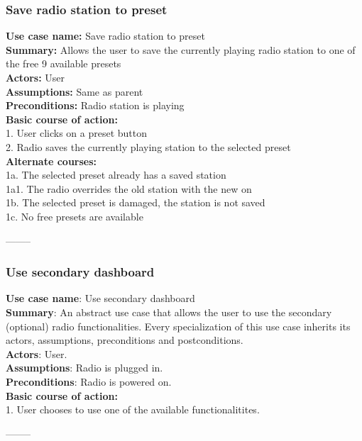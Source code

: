 \documentclass[11pt]{article}
\begin{document}
\subsubsection{Save radio station to preset}
\textbf{Use case name:} Save radio station to preset\\
\textbf{Summary:} Allows the user to save the currently playing radio station to one of the free 9 available presets\\
\textbf{Actors:} User\\
\textbf{Assumptions:} Same as parent\\
\textbf{Preconditions:} Radio station is playing\\
\textbf{Basic course of action:}\\
1. User clicks on a preset button\\
2. Radio saves the currently playing station to the selected preset\\
\textbf{Alternate courses:}\\
1a. The selected preset already has a saved station\\
\hspace*{10mm}1a1. The radio overrides the old station with the new on\\
1b. The selected preset is damaged, the station is not saved\\
1c. No free presets are available
\begin{center}--------\end{center}

\subsubsection{Use secondary dashboard}
\textbf{Use case name}: Use secondary dashboard\\
\textbf{Summary}: An abstract use case that allows the user to use the secondary (optional) radio functionalities. Every specialization of this use case inherits its actors, assumptions, preconditions and postconditions.\\
\textbf{Actors}: User.\\
\textbf{Assumptions}: Radio is plugged in.\\
\textbf{Preconditions}: Radio is powered on.\\
\textbf{Basic course of action:}\\
1. User chooses to use one of the available functionalitites.
\begin{center}--------\end{center}
\end{document}
